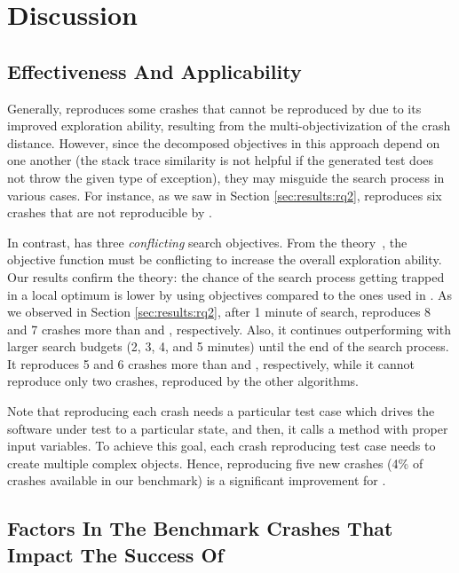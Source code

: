 \section{Discussion}
\label{sec:discussion}

\subsection{Effectiveness And Applicability}
Generally, \decomposition reproduces some crashes that cannot be reproduced by \SGGA due to its improved exploration ability, resulting from the multi-objectivization of the crash distance. However, since the decomposed objectives in this approach depend on one another (\eg the stack trace similarity is not helpful if the generated test does not throw the given type of exception), they may misguide the search process in various cases. For instance, as we saw in Section \ref{sec:results:rq2}, \SGGA reproduces six crashes that are not reproducible by \decomposition.

In contrast, \moho has three \textit{conflicting} search objectives. From the theory~\cite{jensen2004helper}, the objective function must be conflicting to increase the overall exploration ability. Our results confirm the theory: the chance of the search process getting trapped in a local optimum is lower by using \moho objectives compared to the ones used in \decomposition. As we observed in Section \ref{sec:results:rq2}, after 1 minute of search, \moho reproduces 8 and 7 crashes more than \SGGA and \decomposition, respectively. Also, it continues outperforming with larger search budgets (2, 3, 4, and 5 minutes) until the end of the search process. It reproduces 5 and 6 crashes more than \SGGA and \decomposition, respectively, while it cannot reproduce only two crashes, reproduced by the other algorithms.

Note that reproducing each crash needs a particular test case which drives the software under test to a particular state, and then, it calls a method with proper input variables. To achieve this goal, each crash reproducing test case needs to create multiple complex objects. Hence, reproducing five new crashes (4\% of crashes available in our benchmark) is a significant improvement for \moho.

\subsection{Factors In The Benchmark Crashes That Impact The Success Of \moho}
\label{sec:discussion:factors}

